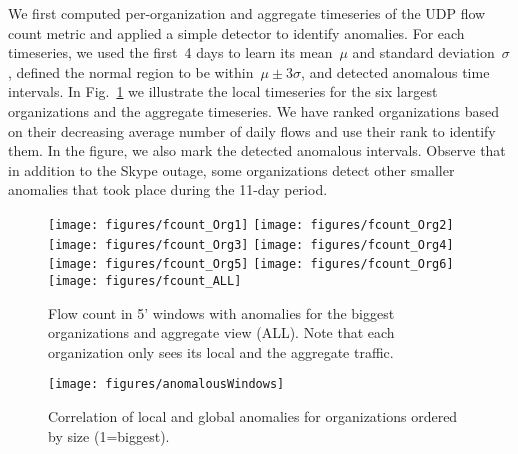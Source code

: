 \documentclass[letterpaper,11pt,onecolumn,titlepage]{article}
\begin{document}
We first computed per-organization and aggregate timeseries of the UDP
flow count metric and applied a simple detector to identify
anomalies. For each timeseries, we used the first~4 days to learn its
mean~$\mu$ and standard deviation~$\sigma$, defined the normal region
to be within~$\mu \pm 3\sigma$, and detected anomalous time intervals. In
Fig.~\ref{fig:flows} we illustrate the local timeseries for the six
largest organizations and the aggregate timeseries. We have ranked
organizations based on their decreasing average number of daily flows
and use their rank to identify them. In the figure, we also mark the
detected anomalous intervals. Observe that in addition to the Skype
outage, some organizations detect other smaller anomalies that took
place during the 11-day period.




\begin{figure}[t]
	\centering 
	\begin{minipage}{0.6\textwidth}
		\texttt{[image: figures/fcount\_Org1]} \vspace{-1pt}
		\texttt{[image: figures/fcount\_Org2]} \vspace{-1pt}
		\texttt{[image: figures/fcount\_Org3]} \vspace{-1pt}
		\texttt{[image: figures/fcount\_Org4]} \vspace{-1pt}
		\texttt{[image: figures/fcount\_Org5]} \vspace{-1pt}
		\texttt{[image: figures/fcount\_Org6]} \vspace{-1pt}
		\texttt{[image: figures/fcount\_ALL]}
	\end{minipage}
	\caption{Flow count in 5' windows with anomalies for the biggest organizations and aggregate view (ALL). Note that
		each organization only sees its local and the aggregate traffic.}
	\label{fig:flows}
\end{figure}

\begin{figure}[t]
	\centering
	\texttt{[image: figures/anomalousWindows]}
	\caption{Correlation of local and global anomalies for organizations ordered by size (1=biggest).}
	\label{fig:anomalyCorrelation} 
\end{figure}
\end{document}
